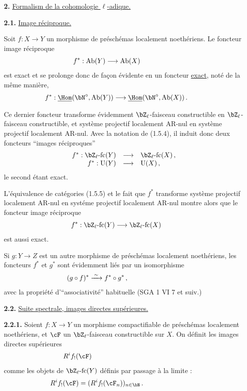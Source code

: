 \newpage

\noindent
\textbf{2.} \underline{Formalism de la cohomologie $\ell$-adique.}

\noindent
\textbf{2.1.} \underline{Image r\'eciproque.}

Soit $f : X \rightarrow Y$ un morphisme de pr\'esch\'emas localement noeth\'eriens. Le foncteur image r\'eciproque
\[
f^* : \mathrm{Ab}(Y) \longrightarrow \mathrm{Ab}(X)\hspace*{2cm}
\]
est exact et se prolonge donc de fa\c con \'evidente en un foncteur \underline{exact}, not\'e de la m\^eme mani\`ere,
\[
f^* : \underline{\Hom}(\bN^{\circ}, \mathrm{Ab}(Y)) \longrightarrow \underline{\Hom}(\bN^{\circ}, \mathrm{Ab}(X))\,.\hspace*{1cm}
\]

Ce dernier foncteur transforme \'evidemment $\bZ_{\ell}$-faisceau constructible en $\bZ_{\ell}$-faisceau constructible, et syst\`eme projectif localement AR-nul en syst\`eme projectif localement AR-nul. Avec la notation de (1.5.4), il induit donc deux foncteurs ``images r\'eciproques''
\[
\begin{array}{rcl}
f^* : \bZ_{\ell}\text{-fc}(Y) & \longrightarrow & \bZ_{\ell}\text{-fc}(X)\,, \\
f^* : \mathrm{U}(Y) & \longrightarrow & \mathrm{U}(X)\,,\hspace*{1cm}
\end{array}
\]
le second \'etant exact.

L'\'equivalence de cat\'egories (1.5.5) et le fait que $f^*$ transforme syst\`eme projectif localement AR-nul en syst\'eme projectif localement AR-nul montre alors que le foncteur image r\'eciproque
\[
f^* : \bZ_{\ell}\text{-fc}(Y) \longrightarrow \bZ_{\ell}\text{-fc}(X)\hspace*{1cm}
\]
est aussi exact.

Si $g : Y \rightarrow Z$ est un autre morphisme de pr\'esch\'emas localement noeth\'eriens, les foncteurs $f^*$ et $g^*$ sont \'evidemment li\'es par un isomorphisme
\[
(g \circ f)^* \xrightarrow{\;\sim\;} f^* \circ g^*\,,\hspace*{3cm}
\]
avec la propri\'et\'e d'``associativit\'e'' habituelle (SGA 1 VI 7 et suiv.)

\bigskip

\noindent
\textbf{2.2.} \underline{Suite spectrale, images directes sup\'erieures.}

\noindent
\textbf{2.2.1.} Soient $f : X \rightarrow Y$ un morphisme compactifiable de pr\'esch\'emas localement noeth\'eriens, et $\cF$ un $\bZ_{\ell}$-faisceau constructible sur $X$. On d\'efinit les images directes sup\'erieures
\[
R^i f_!(\cF)\hspace*{5cm}
\]
comme les objets de $\bZ_{\ell}\text{-fc}(Y)$ d\'efinis par passage \`a la limite :
\[
R^i f_!(\cF) = (R^i f_!(\cF_n))_{n \in \bN}\,.\hspace*{3cm}
\]

